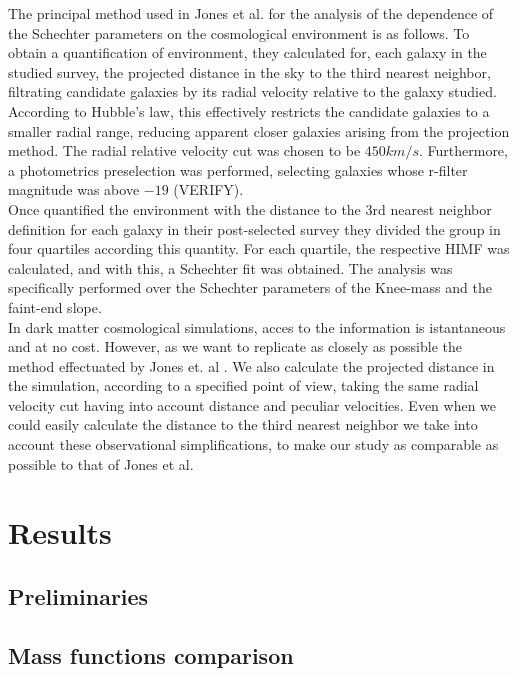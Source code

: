 \documentclass[a4paper,fleqn,usenatbib]{mnras}
\begin{document}
The principal method used in Jones et al. \cite{jones1} for the analysis of the dependence of the Schechter parameters on the cosmological environment is as follows. To obtain a quantification of environment, they calculated for, each galaxy in the studied survey, the projected distance in the sky to the third nearest neighbor, filtrating candidate galaxies by its radial velocity relative to the galaxy studied. According to Hubble's law, this effectively restricts the candidate galaxies to a smaller radial range, reducing apparent closer galaxies arising from the projection method. The radial relative velocity cut was chosen to be $450km/s$. Furthermore, a photometrics preselection was performed, selecting galaxies whose r-filter magnitude was above $-19$ (VERIFY).\\

Once quantified the environment with the distance to the 3rd nearest neighbor definition for each galaxy in their post-selected survey they divided the group in four quartiles according this quantity. For each quartile, the respective HIMF was calculated, and with this, a Schechter fit was obtained. The analysis was specifically performed over the Schechter parameters of the Knee-mass and the faint-end slope.\\

In dark matter cosmological simulations, acces to the information is istantaneous and at no cost. However, as we want to replicate as closely as possible the method effectuated by Jones et. al \cite{jones1}. We also calculate the projected distance in the simulation, according to a specified point of view, taking the same radial velocity cut having into account distance and peculiar velocities. Even when we could easily calculate the distance to the third nearest neighbor we take into account these observational simplifications, to make our study as comparable as possible to that of Jones et al. \cite{jones1}

\section{Results}
\subsection{Preliminaries}

\subsection{Mass functions comparison}
\end{document}
